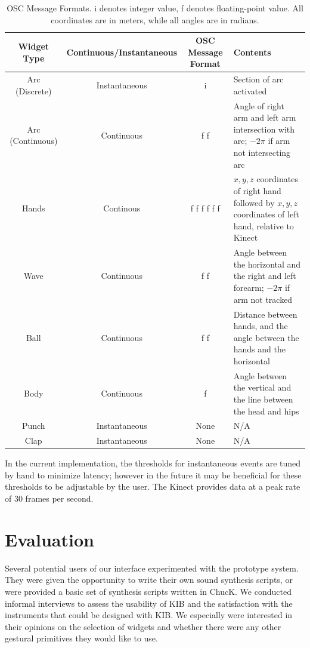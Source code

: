 \documentclass{nime-alternate}
\begin{document}
\begin{table}
\centering
\caption{OSC Message Formats. i denotes integer value, f denotes floating-point value. All coordinates are in meters, while all angles are in radians.}
\begin{tabular}{|c|c|c|p{}|} \hline
\textbf{Widget Type} & \textbf{Continuous/Instantaneous} & \textbf{OSC Message Format} & \textbf{Contents}\\ \hline
Arc (Discrete) & Instantaneous & i & Section of arc activated\\ \hline
Arc (Continuous) & Continuous & f f& Angle of right arm and left arm intersection with arc; $-2\pi$ if arm not intersecting arc\\ \hline
Hands & Continous & f f f f f f & $x,y,z$ coordinates of right hand followed by $x,y,z$ coordinates of left hand, relative to Kinect \\ \hline
Wave & Continuous & f f & Angle between the horizontal and the right and left forearm; $-2\pi$ if arm not tracked\\ \hline
Ball & Continuous & f f & Distance between hands, and the angle between the hands
and the horizontal\\ \hline
Body & Continuous & f & Angle between the vertical and the line between the head and hips\\ \hline
Punch & Instantaneous & None & N/A \\ \hline
Clap & Instantaneous & None & N/A \\ \hline
\end{tabular}
\label{tab:osc}
\end{table}

In the current implementation,
the thresholds for instantaneous events are tuned by hand to minimize latency; however in the
future it may be beneficial for these thresholds to be adjustable by the user. The Kinect provides
data at a peak rate of 30 frames per second.

\section{Evaluation}
Several potential users of our interface experimented with the prototype system. They were
given the opportunity to write their own sound synthesis scripts, or were provided a basic
set of synthesis scripts written in ChucK. We conducted informal interviews to assess the
usability of KIB and the satisfaction with the instruments that could be designed with KIB. We
especially were interested in their opinions on the selection of widgets and whether there
were any other gestural primitives they would like to use.
\end{document}
